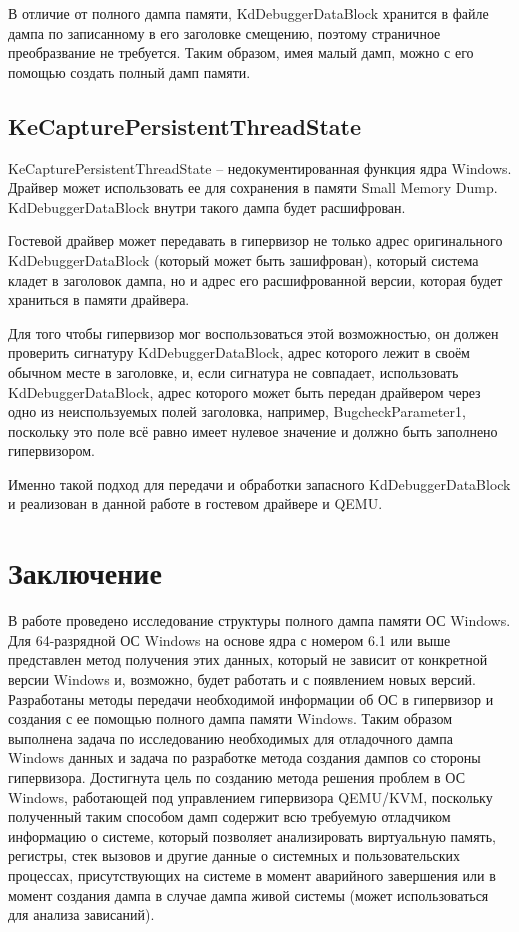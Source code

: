 \documentclass{mipt-thesis-bs}
\begin{document}
В отличие от полного дампа памяти, KdDebuggerDataBlock хранится в файле дампа по записанному в его заголовке смещению, поэтому страничное преобразвание не требуется. Таким образом, имея малый дамп, можно с его помощью создать полный дамп памяти.

\section*{KeCapturePersistentThreadState}

KeCapturePersistentThreadState -- недокументированная функция ядра Windows. Драйвер может использовать ее для сохранения в памяти Small Memory Dump\cite{kcpts}. KdDebuggerDataBlock внутри такого дампа будет расшифрован.

Гостевой драйвер может передавать в гипервизор не только адрес оригинального KdDebuggerDataBlock (который может быть зашифрован), который система кладет в заголовок дампа, но и адрес его расшифрованной версии, которая будет храниться в памяти драйвера.

Для того чтобы гипервизор мог воспользоваться этой возможностью, он должен проверить сигнатуру KdDebuggerDataBlock, адрес которого лежит в своём обычном месте в заголовке, и, если сигнатура не совпадает, использовать KdDebuggerDataBlock, адрес которого может быть передан драйвером через одно из неиспользуемых полей заголовка, например, BugcheckParameter1, поскольку это поле всё равно имеет нулевое значение и должно быть заполнено гипервизором.

Именно такой подход для передачи и обработки запасного KdDebuggerDataBlock и реализован в данной работе в гостевом драйвере и QEMU.

\chapter{Заключение}

В работе проведено исследование структуры полного дампа памяти ОС Windows. Для 64-разрядной ОС Windows на основе ядра с номером 6.1 или выше представлен метод получения этих данных, который не зависит от конкретной версии Windows и, возможно, будет работать и с появлением новых версий. Разработаны методы передачи необходимой информации об ОС в гипервизор и создания с ее помощью полного дампа памяти Windows. Таким образом выполнена задача по исследованию необходимых для отладочного дампа Windows данных и задача по разработке метода создания дампов со стороны гипервизора. Достигнута цель по созданию метода решения проблем в ОС Windows, работающей под управлением гипервизора QEMU/KVM, поскольку полученный таким способом дамп содержит всю требуемую отладчиком информацию о системе, который позволяет анализировать виртуальную память, регистры, стек вызовов и другие данные о системных и пользовательских процессах, присутствующих на системе в момент аварийного завершения или в момент создания дампа в случае дампа живой системы (может использоваться для анализа зависаний).
\end{document}
